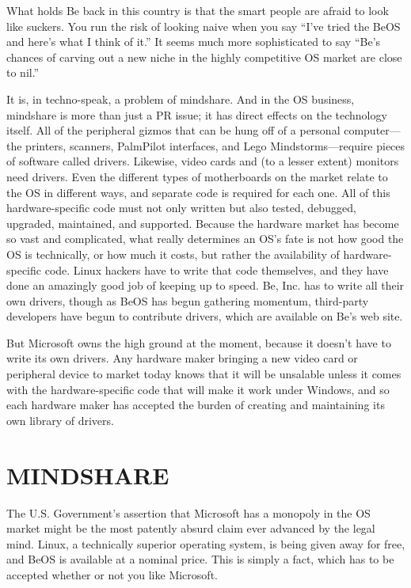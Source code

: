 \documentclass[
  fontsize=11pt,
  paper=landscape,
  twocolumn=true,
  pagesize=pdftex,
  headings=small,
  DIV=15,
  ]{scrartcl}
\begin{document}
What holds Be back in this country is that the smart people are afraid
to look like suckers. You run the risk of looking naive when you say
``I've tried the BeOS and here's what I think of it.'' It seems much
more sophisticated to say ``Be's chances of carving out a new niche in
the highly competitive OS market are close to nil.''

It is, in techno-speak, a problem of mindshare. And in the OS business,
mindshare is more than just a PR issue; it has direct effects on the
technology itself. All of the peripheral gizmos that can be hung off of
a personal computer---the printers, scanners, PalmPilot interfaces, and
Lego Mindstorms---require pieces of software called drivers. Likewise,
video cards and (to a lesser extent) monitors need drivers. Even the
different types of motherboards on the market relate to the OS in
different ways, and separate code is required for each one. All of this
hardware-specific code must not only written but also tested, debugged,
upgraded, maintained, and supported. Because the hardware market has
become so vast and complicated, what really determines an OS's fate is
not how good the OS is technically, or how much it costs, but rather the
availability of hardware-specific code. Linux hackers have to write that
code themselves, and they have done an amazingly good job of keeping up
to speed. Be, Inc. has to write all their own drivers, though as BeOS
has begun gathering momentum, third-party developers have begun to
contribute drivers, which are available on Be's web site.

But Microsoft owns the high ground at the moment, because it doesn't
have to write its own drivers. Any hardware maker bringing a new video
card or peripheral device to market today knows that it will be
unsalable unless it comes with the hardware-specific code that will make
it work under Windows, and so each hardware maker has accepted the
burden of creating and maintaining its own library of drivers.

\section{MINDSHARE}

The U.S. Government's assertion that Microsoft has a monopoly in the OS
market might be the most patently absurd claim ever advanced by the
legal mind. Linux, a technically superior operating system, is being
given away for free, and BeOS is available at a nominal price. This is
simply a fact, which has to be accepted whether or not you like
Microsoft.
\end{document}
